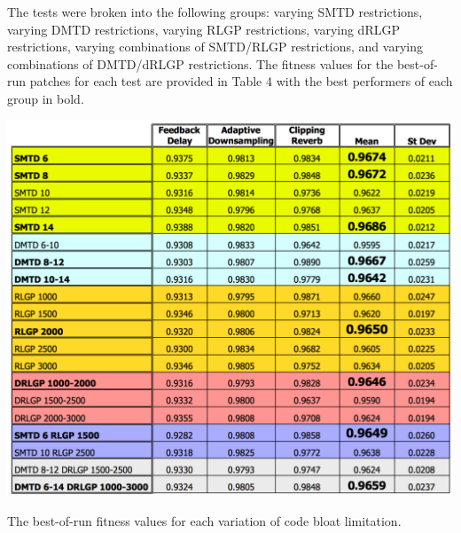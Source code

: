 \documentclass[12pt]{report} 	%
\numberwithin{figure}{chapter}
\numberwithin{table}{chapter}
\numberwithin{equation}{chapter}
\begin{document}
\begin{flushleft}
The tests were broken into the following groups: varying SMTD restrictions, varying DMTD restrictions, varying RLGP restrictions, varying dRLGP restrictions, varying combinations of SMTD/RLGP restrictions, and varying combinations of DMTD/dRLGP restrictions. The fitness values for the best-of-run patches for each test are provided in Table 4 with the best performers of each group in bold.
\begin{table}[h!]
\begin{center}
\includegraphics[scale=0.6,width=\linewidth]{ResourceLimTable1}
\caption[Code bloat limitation best-of-run values]{The best-of-run fitness values for each variation of code bloat limitation.}
\end{center}
\vspace{12pt}
\end{table}


\end{flushleft}
\end{document}

